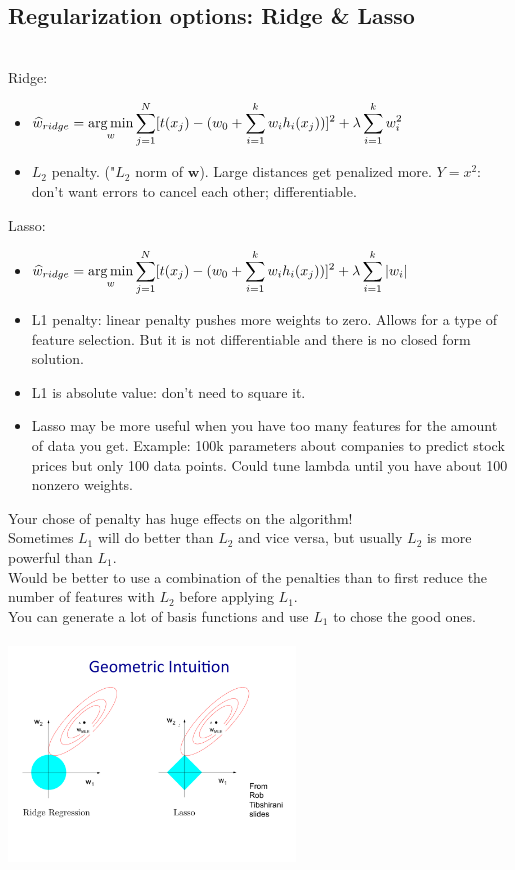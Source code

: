 \subsection{Regularization options: Ridge \& Lasso}  \hfill \\
Ridge: 
\begin{itemize}
	\item $ \displaystyle \widehat{w}_{ridge} = \operatorname*{arg\,min}_w \sum_{j=1}^N [t(x_j) - (w_0 + \sum_{i=1}^k w_i h_i(x_j))]^2 + \lambda \sum_{i=1}^k w_i^2   $ 
	\item $L_2$ penalty.  ("$L_2$ norm of $\bm{w}$).  
		Large distances get penalized more.  $Y = x^2$: 
		don't want errors to cancel each other; differentiable. 
\end{itemize}
Lasso: \hfill \\
\begin{itemize}
	\item$ \displaystyle \widehat{w}_{ridge} = \operatorname*{arg\,min}_w \sum_{j=1}^N [t(x_j) - (w_0 + \sum_{i=1}^k w_i h_i(x_j))]^2 + \lambda \sum_{i=1}^k |w_i|   $ 
	\item L1 penalty: linear penalty pushes more weights to zero.  Allows for a type of feature selection.  But it is not differentiable and there is no closed form solution. 
	\item L1 is absolute value: don't need to square it. 
	\item Lasso may be more useful when you have too many features for the amount of data you get.  
		Example: 100k parameters about companies to predict stock prices but only 100 data points.  
		Could tune lambda until you have about 100 nonzero weights. 
\end{itemize}

Your chose of penalty has huge effects on the algorithm! \hfill \\
Sometimes $L_1$ will do better than $L_2$ and vice versa, but usually $L_2$ is more powerful than $L_1$. \hfill \\
Would be better to use a combination of the penalties than to first reduce the number of features with $L_2$ before applying $L_1$.    \hfill \\
You can generate a lot of basis functions and use $L_1$ to chose the good ones. \hfill \\
\hfill \\

\includegraphics[width=3in]{figures/lasso_and_ridge_geometry.pdf}

